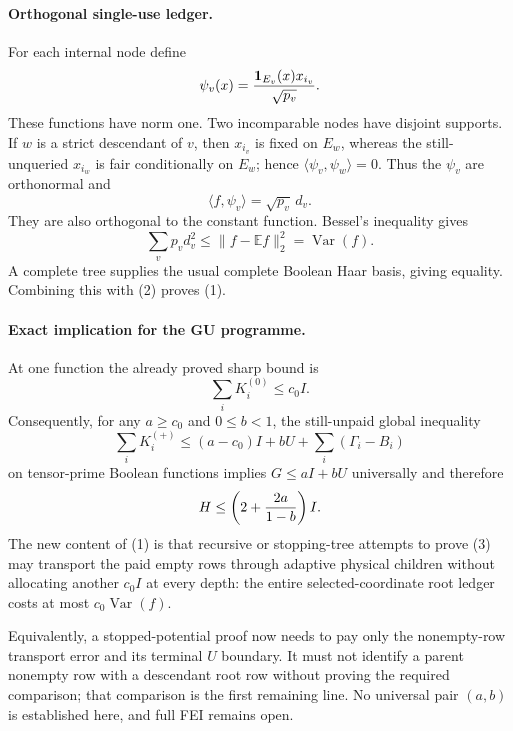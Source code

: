 \paragraph{Orthogonal single-use ledger.}
For each internal node define
\[
 \psi_v(x)={\mathbf1_{E_v}(x)x_{i_v}\over\sqrt{p_v}}.
\]
These functions have norm one.  Two incomparable nodes have disjoint
supports.  If $w$ is a strict descendant of $v$, then $x_{i_v}$ is fixed
on $E_w$, whereas the still-unqueried $x_{i_w}$ is fair conditionally on
$E_w$; hence $\langle\psi_v,\psi_w\rangle=0$.  Thus the $\psi_v$ are
orthonormal and
\[
 \langle f,\psi_v\rangle=\sqrt{p_v}\,d_v.
\]
They are also orthogonal to the constant function.  Bessel's inequality
gives
\[
 \sum_vp_vd_v^2\le\|f-\mathbb Ef\|_2^2=\operatorname {Var}(f).
\]
A complete tree supplies the usual complete Boolean Haar basis, giving
equality.  Combining this with (2) proves (1).

\paragraph{Exact implication for the GU programme.}
At one function the already proved sharp bound is
\[
 \sum_iK_i^{(0)}\le c_0I.
\]
Consequently, for any $a\ge c_0$ and $0\le b<1$, the still-unpaid global
inequality
\[
 \sum_iK_i^{(+)}
 \le(a-c_0)I+bU+\sum_i(\Gamma_i-B_i)                \tag{3}
\]
on tensor-prime Boolean functions implies $G\le aI+bU$ universally and
therefore
\[
 H\le\left(2+{2a\over1-b}\right)I.
\]
The new content of (1) is that recursive or stopping-tree attempts to
prove (3) may transport the paid empty rows through adaptive physical
children without allocating another $c_0I$ at every depth: the entire
selected-coordinate root ledger costs at most $c_0\operatorname{Var}(f)$.

Equivalently, a stopped-potential proof now needs to pay only the
nonempty-row transport error and its terminal $U$ boundary.  It must not
identify a parent nonempty row with a descendant root row without proving
the required comparison; that comparison is the first remaining line.
No universal pair $(a,b)$ is established here, and full FEI remains open.

